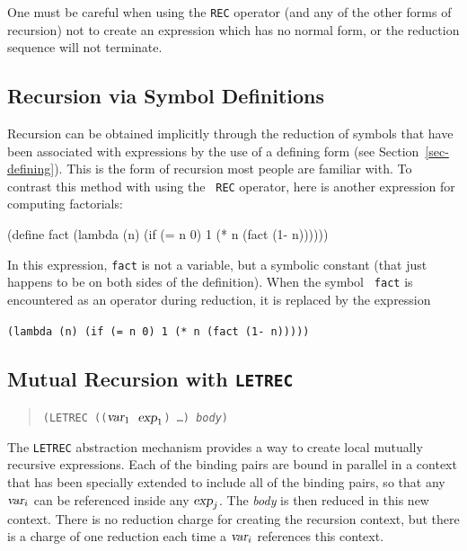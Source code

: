 	One must be careful when
using the {\tt REC} operator (and any of the other forms of recursion) not
to create an expression which has no normal form, or the reduction
sequence will not terminate.

\subsection{Recursion via Symbol Definitions}

	Recursion can be obtained implicitly through the reduction of symbols
that have been associated with expressions by the use of a defining form
(see Section~\ref{sec-defining}).  This is the form of recursion most
people are familiar with.  To contrast this method with using the {\tt
REC} operator, here is another expression for computing factorials:
\begin{center}\begin{tt}
	(define fact  (lambda (n) (if (= n 0) 1 (* n (fact (1- n))))))
\end{tt}\end{center}
In this expression, {\tt fact} is not a variable, but a symbolic
constant (that just happens to be on both sides of the definition).  
When the symbol {\tt
fact} is encountered as an operator during reduction, it is replaced by
the expression 
\begin{center}
	{\tt (lambda (n) (if (= n 0) 1 (* n (fact (1- n)))))}
\end{center}


\pagebreak
\subsection{Mutual Recursion with {\tt LETREC}}

\begin{quote}
	{\tt (LETREC ((${\mbox{\sl var}}_1$ ${\mbox{\sl exp}}_1$) \ldots) 
				{\sl body})}
\end{quote}

	The {\tt LETREC} abstraction mechanism provides a way to create local
mutually recursive expressions.  Each of the binding pairs are bound in
parallel in a context that has been specially extended to include all of
the binding pairs, so that any ${\mbox{\sl var}}_i$ can be referenced
inside any ${\mbox{\sl exp}}_j$.  The {\sl body} is then reduced in this
new context. There is no reduction charge for creating the recursion
context, but there is a charge of one reduction each time a 
${\mbox{\sl var}}_i$ references this context.

